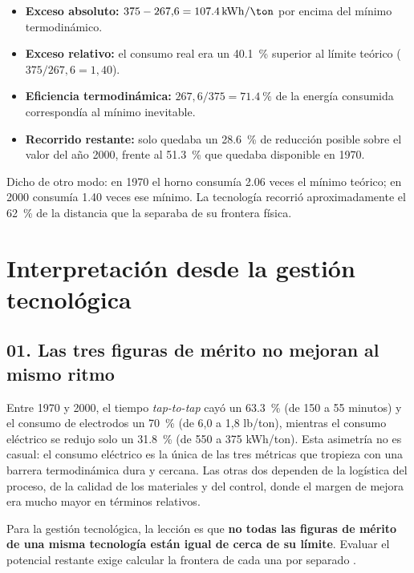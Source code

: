 \documentclass[11pt,letterpaper]{article}
\begin{document}
\begin{itemize}
  \item \textbf{Exceso absoluto:} $375 - 267{,}6 = \SI{107.4}{\kWh\per\ton}$ por
    encima del mínimo termodinámico.
  \item \textbf{Exceso relativo:} el consumo real era un \SI{40.1}{\percent}
    superior al límite teórico ($375 / 267{,}6 = 1{,}40$).
  \item \textbf{Eficiencia termodinámica:} $267{,}6 / 375 =
    \SI{71.4}{\percent}$ de la energía consumida correspondía al mínimo
    inevitable.
  \item \textbf{Recorrido restante:} solo quedaba un \SI{28.6}{\percent} de
    reducción posible sobre el valor del año 2000, frente al
    \SI{51.3}{\percent} que quedaba disponible en 1970.
\end{itemize}

Dicho de otro modo: en 1970 el horno consumía \num{2.06} veces el mínimo
teórico; en 2000 consumía \num{1.40} veces ese mínimo. La tecnología recorrió
aproximadamente el \SI{62}{\percent} de la distancia que la separaba de su
frontera física.

\section{Interpretación desde la gestión tecnológica}

\subsection*{01. Las tres figuras de mérito no mejoran al mismo ritmo}

Entre 1970 y 2000, el tiempo \emph{tap-to-tap} cayó un \SI{63.3}{\percent} (de
150 a 55 minutos) y el consumo de electrodos un \SI{70}{\percent} (de 6,0 a 1,8
lb/ton), mientras el consumo eléctrico se redujo solo un \SI{31.8}{\percent} (de
550 a 375 kWh/ton). Esta asimetría no es casual: el consumo eléctrico es la
única de las tres métricas que tropieza con una barrera termodinámica dura y
cercana. Las otras dos dependen de la logística del proceso, de la calidad de los
materiales y del control, donde el margen de mejora era mucho mayor en términos
relativos.

Para la gestión tecnológica, la lección es que \textbf{no todas las figuras de
mérito de una misma tecnología están igual de cerca de su límite}. Evaluar el
potencial restante exige calcular la frontera de cada una por separado
\parencite{foster1986}.
\end{document}
